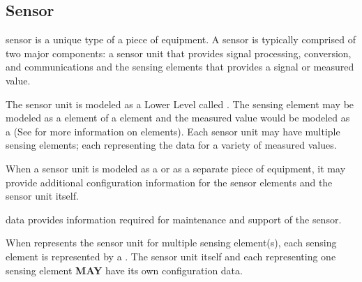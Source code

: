 \subsection{Sensor} 


\gls{sensor} is a unique type of a piece of equipment.  A \gls{sensor} is typically comprised of two major components: a \gls{sensor unit} that provides signal processing, conversion, and communications and the \glspl{sensing element} that provides a signal or measured value.

The \gls{sensor unit} is modeled as a \gls{Lower Level}  called .  The \gls{sensing element} may be modeled as a  element of a  element and the measured value would be modeled as a  (See  for more information on  elements).  Each \gls{sensor unit} may have multiple \glspl{sensing element}; each representing the data for a variety of measured values.

When a \gls{sensor unit} is modeled as a  or as a separate piece of equipment, it may provide additional configuration information for the \glspl{sensor element} and the \gls{sensor unit} itself.  

 data provides information required for maintenance and support of the sensor.

When  represents the \gls{sensor unit} for multiple \gls{sensing element}(s), each sensing element is represented by a .   The \gls{sensor unit} itself and each  representing one \gls{sensing element} \textbf{MAY} have its own configuration data.

